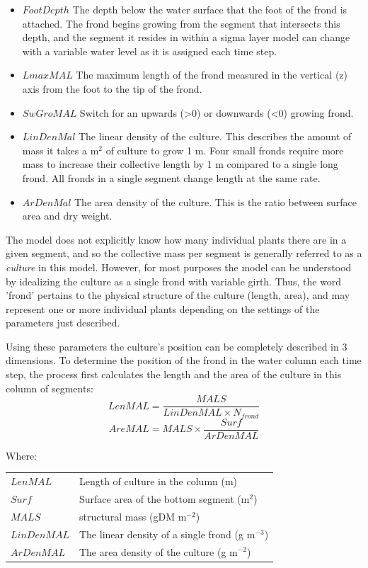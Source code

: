 \documentclass{deltares_manual}
\begin{document}
\begin{itemize}
\item $FootDepth$ The depth below the water surface that the foot of the frond is attached. The frond begins growing from the segment that intersects this depth, and the segment it resides in within a sigma layer model can change with a variable water level as it is assigned each time step.
\item $LmaxMAL$ The maximum length of the frond measured in the vertical (z) axis from the foot to the tip of the frond.
\item $SwGroMAL$ Switch for an upwards (\textgreater 0) or downwards (\textless 0) growing frond.
\item $LinDenMal$ The linear density of the culture. This describes the amount of mass it takes a m$^{2}$ of culture to grow 1 m. Four small fronds require more mass to increase their collective length by 1 m compared to a single long frond. All fronds in a single segment change length at the same rate.
\item $ArDenMal$ The area density of the culture. This is the ratio between surface area and dry weight.
\end{itemize}
The model does not explicitly know how many individual plants there are in a given segment, and so the collective mass per segment is generally referred to as a \textit{culture} in this model. However, for most purposes the model can be understood by idealizing the culture as a single frond with variable girth. Thus, the word 'frond' pertains to the physical structure of the culture (length, area), and may represent one or more individual plants depending on the settings of the parameters just described. 

Using these parameters the culture's position can be completely described in 3 dimensions. To determine the position of the frond in the water column each time step, the process first calculates the length and the area of the culture in this column of segments:
\begin{equation}
	LenMAL = \frac{MALS}{LinDenMAL \times N_{frond}}
\end{equation}
\begin{equation}
	AreMAL = MALS \times \frac{Surf}{ArDenMAL}
\end{equation}


Where:\\

\begin{tabular}{ll}
$LenMAL$ & Length of culture in the column (m)\\
$Surf$ & Surface area of the bottom segment (m$^{2}$)\\
$MALS$ & structural mass (gDM m$^{-2}$)\\
$LinDenMAL$ & The linear density of a single frond (g m$^{-3}$)\\
$ArDenMAL$ & The area density of the culture (g m$^{-2}$)\\
\end{tabular}
\end{document}
